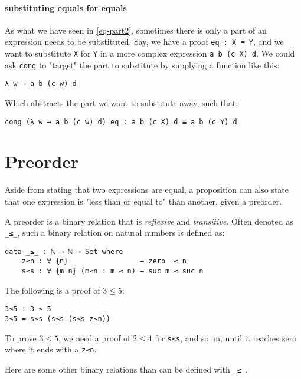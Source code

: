 \documentclass[../thesis.tex]{subfiles}
\begin{document}
\paragraph{substituting equals for equals}

As what we have seen in \ref{eq-part2}, sometimes there is only a part of an
expression needs to be substituted.
Say, we have a proof {\lstinline|eq : X ≡ Y|}, and we want to substitute {\lstinline|X|}
for {\lstinline|Y|} in a more complex expression {\lstinline|a b (c X) d|}.
We could ask {\lstinline|cong|} to "target" the part to substitute by supplying a
function like this:

\begin{lstlisting}
λ w → a b (c w) d
\end{lstlisting}

Which abstracts the part we want to substitute away, such that:

\begin{lstlisting}
cong (λ w → a b (c w) d) eq : a b (c X) d ≡ a b (c Y) d
\end{lstlisting}

\section{Preorder}

Aside from stating that two expressions are equal, a proposition can also state
that one expression is "less than or equal to" than another, given a preorder.

A preorder is a binary relation that is \textit{reflexive} and \textit{transitive}.
Often denoted as {\lstinline|_≤_|}, such a binary relation on natural numbers is
defined as:

\begin{lstlisting}
data _≤_ : ℕ → ℕ → Set where
    z≤n : ∀ {n}                 → zero  ≤ n
    s≤s : ∀ {m n} (m≤n : m ≤ n) → suc m ≤ suc n
\end{lstlisting}

The following is a proof of $ 3 \leq 5 $:

\begin{lstlisting}
3≤5 : 3 ≤ 5
3≤5 = s≤s (s≤s (s≤s z≤n))
\end{lstlisting}

To prove $ 3 \leq 5 $, we need a proof of $ 2 \leq 4 $ for {\lstinline|s≤s|},
and so on, until it reaches zero where it ends with a {\lstinline|z≤n|}.

Here are some other binary relations than can be defined with {\lstinline|_≤_|}.
\end{document}
